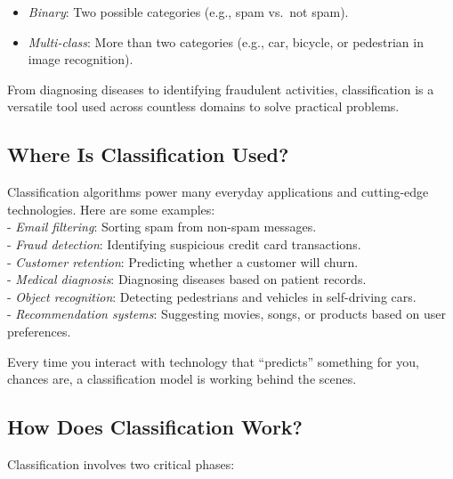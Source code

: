 \documentclass[
]{book}
\providecommand{\tightlist}{%
  \setlength{\itemsep}{0pt}\setlength{\parskip}{0pt}}
\theoremstyle{definition}
\theoremstyle{definition}
\theoremstyle{definition}
\theoremstyle{definition}
\theoremstyle{remark}
\begin{document}
\begin{itemize}
\tightlist
\item
  \emph{Binary}: Two possible categories (e.g., spam vs.~not spam).\\
\item
  \emph{Multi-class}: More than two categories (e.g., car, bicycle, or pedestrian in image recognition).
\end{itemize}

From diagnosing diseases to identifying fraudulent activities, classification is a versatile tool used across countless domains to solve practical problems.

\subsection*{Where Is Classification Used?}\label{where-is-classification-used}

Classification algorithms power many everyday applications and cutting-edge technologies. Here are some examples:\\
- \emph{Email filtering}: Sorting spam from non-spam messages.\\
- \emph{Fraud detection}: Identifying suspicious credit card transactions.\\
- \emph{Customer retention}: Predicting whether a customer will churn.\\
- \emph{Medical diagnosis}: Diagnosing diseases based on patient records.\\
- \emph{Object recognition}: Detecting pedestrians and vehicles in self-driving cars.\\
- \emph{Recommendation systems}: Suggesting movies, songs, or products based on user preferences.

Every time you interact with technology that ``predicts'' something for you, chances are, a classification model is working behind the scenes.

\subsection*{How Does Classification Work?}\label{how-does-classification-work}

Classification involves two critical phases:
\end{document}
